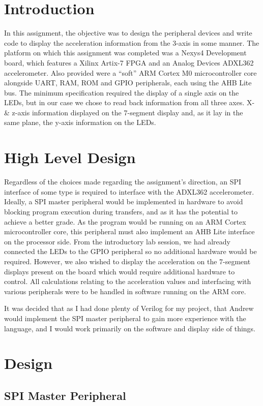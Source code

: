 \documentclass[11pt,british]{report}
\begin{document}
\section*{Introduction}
In this assignment, the objective was to design the peripheral devices and write code to display the acceleration information from the 3-axis in some manner. The platform on which this assignment was completed was a Nexys4 Development board, which features a Xilinx Artix-7 FPGA and an Analog Devices ADXL362 accelerometer. Also provided were a ``soft'' ARM Cortex M0 microcontroller core alongside UART, RAM, ROM and GPIO peripherals, each using the AHB Lite bus. The minimum specification required the display of a single axis on the LEDs, but in our case we chose to read back information from all three axes. X- \& z-axis information displayed on the 7-segment display and, as it lay in the same plane, the y-axis information on the LEDs. 

\section*{High Level Design}
Regardless of the choices made regarding the assignment's direction, an SPI interface of some type is required to interface with the ADXL362 accelerometer. Ideally, a SPI master peripheral would be implemented in hardware to avoid blocking program execution during transfers, and as it has the potential to achieve a better grade. As the program would be running on an ARM Cortex microcontroller core, this peripheral must also implement an AHB Lite interface on the processor side. From the introductory lab session, we had already connected the LEDs to the GPIO peripheral so no additional hardware would be required. However, we also wished to display the acceleration on the 7-segment displays present on the board which would require additional hardware to control. All calculations relating to the acceleration values and interfacing with various peripherals were to be handled in software running on the ARM core.

It was decided that as I had done plenty of Verilog for my project, that Andrew would implement the SPI master peripheral to gain more experience with the language, and I would work primarily on the software and display side of things.

\section*{Design}
\subsection*{SPI Master Peripheral}
\end{document}
